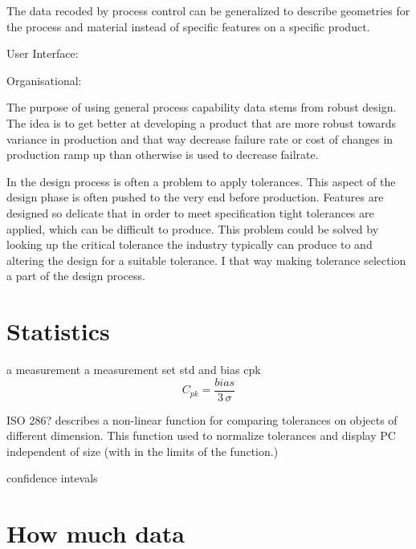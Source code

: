 \documentclass[aip,amsmath, reprint, author-year]{revtex4-1}
\begin{document}
The data recoded by process control can be generalized to describe geometries for the process and material instead of specific features on a specific product. 

User Interface: 


Organisational: 


The purpose of using general process capability data stems from robust design. The idea is to get better at developing a product that are more robust towards variance in production and that way decrease failure rate or cost of changes in production ramp up than otherwise is used to decrease failrate.



In the design process is often a problem to apply tolerances. This aspect of the design phase is often pushed to the very end before production. Features are designed so delicate that in order to meet specification tight tolerances are applied, which can be difficult to produce.
This problem could be solved by looking up the critical tolerance the industry typically can produce to and altering the design for a suitable tolerance.  I that way making tolerance selection a part of the design process.


\section{Statistics}

a measurement
a measurement set
std and bias
cpk 
\begin{equation}
C_{pk} = \frac{bias}{3 \, \sigma}
\label{eq:sddj}
\end{equation}


ISO 286? describes a non-linear function for comparing tolerances on objects of different dimension. This function used to normalize tolerances and display PC independent of size (with in the limits of the function.)  

confidence intevals

\section{How much data}
\end{document}
